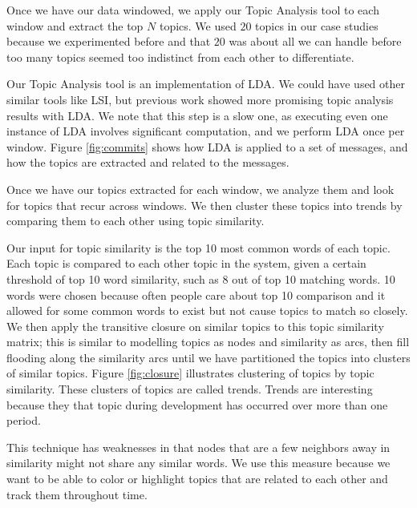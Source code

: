 \documentclass[times, 10pt,twocolumn]{article}
\newcommand{\shrinkit}{\vspace*{-.3em}}
\begin{document}
\shrinkit
{}
\shrinkit

Once we have our data windowed, we apply our Topic Analysis tool to
each window and extract the top $N$ topics. We used $20$ topics in our
case studies because we experimented before and that $20$ was about
all we can handle before too many topics seemed too indistinct from
each other to differentiate.

 Our Topic Analysis tool is an implementation of LDA.
We could have used other similar tools like LSI, but previous work
showed more promising topic analysis results with LDA.  We note that
this step is a slow one, as executing even one instance of LDA
involves significant computation, and we perform LDA once per window.
Figure \ref{fig:commits} shows how LDA is applied to a set of
messages, and how the topics are extracted and related to the
messages.





\shrinkit
{}
\shrinkit


Once we have our topics extracted for each window, we analyze them and
look for topics that recur across windows.  We then cluster these
topics into trends by comparing them to each other using topic similarity.

Our input for topic similarity is the top 10 most common words of each
topic.  Each topic is compared to each other topic in the system,
given a certain threshold of top 10 word similarity, such as 8 out of
top 10 matching words.  10 words were chosen because often people care
about top 10 comparison and it allowed for some common words to exist
but not cause topics to match so closely.  We then apply the
transitive closure on similar topics to this topic similarity matrix;
this is similar to modelling topics as nodes and similarity as arcs,
then fill flooding along the similarity arcs until we have partitioned
the topics into clusters of similar topics. Figure \ref{fig:closure}
illustrates clustering of topics by topic similarity. These clusters
of topics are called trends. 
Trends are interesting because they that topic during development has occurred over more than one period.


This technique has weaknesses in that nodes that are a few neighbors
away in similarity might not share any similar words.  We use this
measure because we want to be able to color or highlight topics that
are related to each other and track them throughout time.
\end{document}
